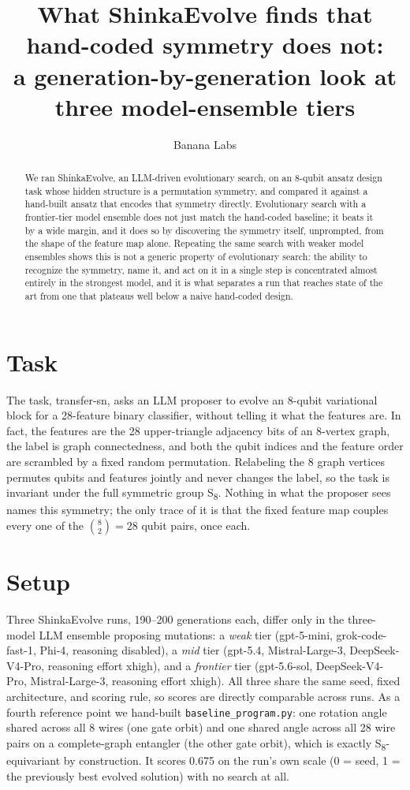 \documentclass{article}
\title{\vspace{-1em}What ShinkaEvolve finds that hand-coded symmetry does not:\\
a generation-by-generation look at three model-ensemble tiers\vspace{-0.3em}}
\author{Banana Labs}
\date{}
\begin{document}
\maketitle
\vspace{-1.6em}

\begin{abstract}
\noindent We ran ShinkaEvolve, an LLM-driven evolutionary search, on an
8-qubit ansatz design task whose hidden structure is a permutation symmetry,
and compared it against a hand-built ansatz that encodes that symmetry
directly. Evolutionary search with a frontier-tier model ensemble does not
just match the hand-coded baseline; it beats it by a wide margin, and it does
so by discovering the symmetry itself, unprompted, from the shape of the
feature map alone. Repeating the same search with weaker model ensembles
shows this is not a generic property of evolutionary search: the ability to
recognize the symmetry, name it, and act on it in a single step is
concentrated almost entirely in the strongest model, and it is what
separates a run that reaches state of the art from one that plateaus well
below a naive hand-coded design.
\end{abstract}

\section*{Task}
The task, transfer-sn, asks an LLM proposer to evolve an 8-qubit variational
block for a 28-feature binary classifier, without telling it what the
features are. In fact, the features are the 28 upper-triangle adjacency bits
of an 8-vertex graph, the label is graph connectedness, and both the qubit
indices and the feature order are scrambled by a fixed random permutation.
Relabeling the 8 graph vertices permutes qubits and features jointly and
never changes the label, so the task is invariant under the full symmetric
group S\textsubscript{8}. Nothing in what the proposer sees names this
symmetry; the only trace of it is that the fixed feature map couples every
one of the $\binom{8}{2}=28$ qubit pairs, once each.

\section*{Setup}
Three ShinkaEvolve runs, 190--200 generations each, differ only in the
three-model LLM ensemble proposing mutations: a \emph{weak} tier
(gpt-5-mini, grok-code-fast-1, Phi-4, reasoning disabled), a \emph{mid} tier
(gpt-5.4, Mistral-Large-3, DeepSeek-V4-Pro, reasoning effort xhigh), and a
\emph{frontier} tier (gpt-5.6-sol, DeepSeek-V4-Pro, Mistral-Large-3,
reasoning effort xhigh). All three share the same seed, fixed architecture,
and scoring rule, so scores are directly comparable across runs. As a fourth
reference point we hand-built \texttt{baseline\_program.py}: one rotation
angle shared across all 8 wires (one gate orbit) and one shared angle across
all 28 wire pairs on a complete-graph entangler (the other gate orbit),
which is exactly S\textsubscript{8}-equivariant by construction. It scores
0.675 on the run's own scale (0 = seed, 1 = the previously best evolved
solution) with no search at all.
\end{document}
